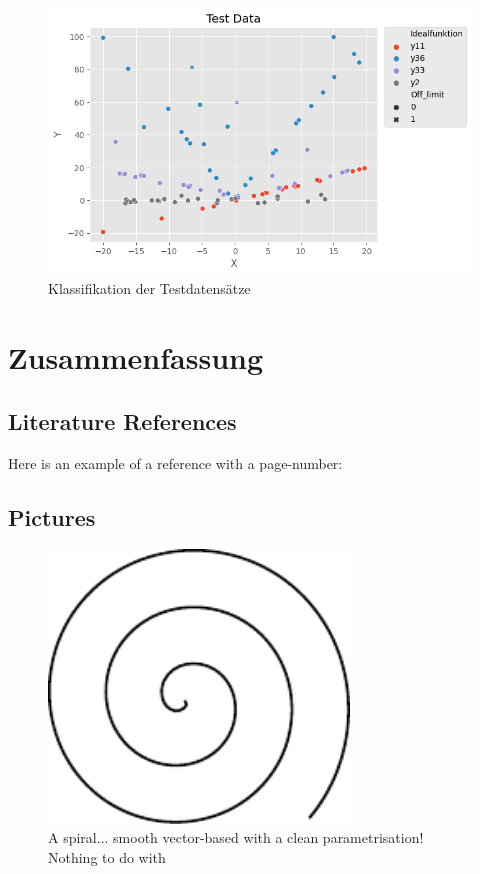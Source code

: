 \begin{figure}[h]
\centering
\includegraphics[width=12cm]{../output/figures/test.png}
\caption{Klassifikation der Testdatensätze \cite{Gage:18}}\label{fig:test}
\end{figure}


\chapter{Zusammenfassung}





\section{Literature References}
Here is an example of a reference with a page-number: \cite[S. 6]{DueckKo:2016}


\section{Pictures}

\begin{figure}[h]
\centering
\includegraphics[width=8cm]{pics/spiral.pdf}
\caption{A spiral... smooth vector-based with a clean parametrisation! \\ Nothing to do with \cite{Gage:18}}\label{fig:spiral}
\end{figure}
\FloatBarrier

